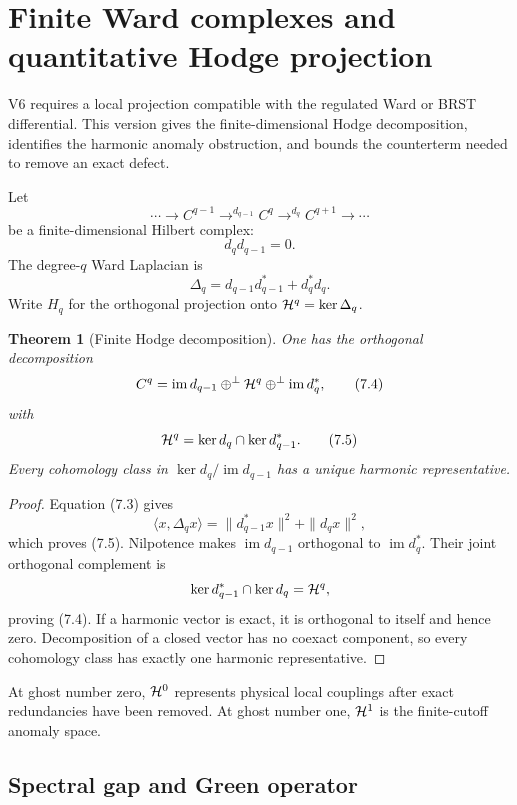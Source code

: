 \documentclass[11pt]{article}
\newtheorem{theorem}{Theorem}[section]
\theoremstyle{remark}
\begin{document}
\section{Finite Ward complexes and quantitative Hodge projection}
\label{sec:v12v7}

V6 requires a local projection compatible with the regulated Ward or
BRST differential.  This version gives the finite-dimensional Hodge
decomposition, identifies the harmonic anomaly obstruction, and
bounds the counterterm needed to remove an exact defect.

Let
\[
 \cdots\longrightarrow C^{q-1}
 \mathop{\longrightarrow}^{d_{q-1}} C^q
 \mathop{\longrightarrow}^{d_q} C^{q+1}
 \longrightarrow\cdots                                      \tag{7.1}
\]
be a finite-dimensional Hilbert complex:
\[
                              d_qd_{q-1}=0.                  \tag{7.2}
\]
The degree-\(q\) Ward Laplacian is
\[
 \Delta_q=d_{q-1}d_{q-1}^*+d_q^*d_q.                       \tag{7.3}
\]
Write \(H_q\) for the orthogonal projection onto
\({\cal H}^q=\ker\Delta_q\).

\begin{theorem}[Finite Hodge decomposition]
\label{thm:v12v7-hodge}
One has the orthogonal decomposition
\[
 C^q=\operatorname{im}d_{q-1}
       \mathbin{\oplus^\perp}{\cal H}^q
       \mathbin{\oplus^\perp}\operatorname{im}d_q^*,         \tag{7.4}
\]
with
\[
 {\cal H}^q=\ker d_q\cap\ker d_{q-1}^*.                     \tag{7.5}
\]
Every cohomology class in
\(\ker d_q/\operatorname{im}d_{q-1}\) has a unique harmonic
representative.
\end{theorem}

\begin{proof}
Equation (7.3) gives
\[
 \langle x,\Delta_qx\rangle
 =\|d_{q-1}^*x\|^2+\|d_qx\|^2,
\]
which proves (7.5).  Nilpotence makes
\(\operatorname{im}d_{q-1}\) orthogonal to
\(\operatorname{im}d_q^*\).  Their joint orthogonal complement is
\[
 \ker d_{q-1}^*\cap\ker d_q={\cal H}^q,
\]
proving (7.4).  If a harmonic vector is exact, it is orthogonal to
itself and hence zero.  Decomposition of a closed vector has no
coexact component, so every cohomology class has exactly one harmonic
representative.
\end{proof}

At ghost number zero, \({\cal H}^0\) represents physical local
couplings after exact redundancies have been removed.  At ghost number
one, \({\cal H}^1\) is the finite-cutoff anomaly space.

\subsection{Spectral gap and Green operator}
\end{document}
